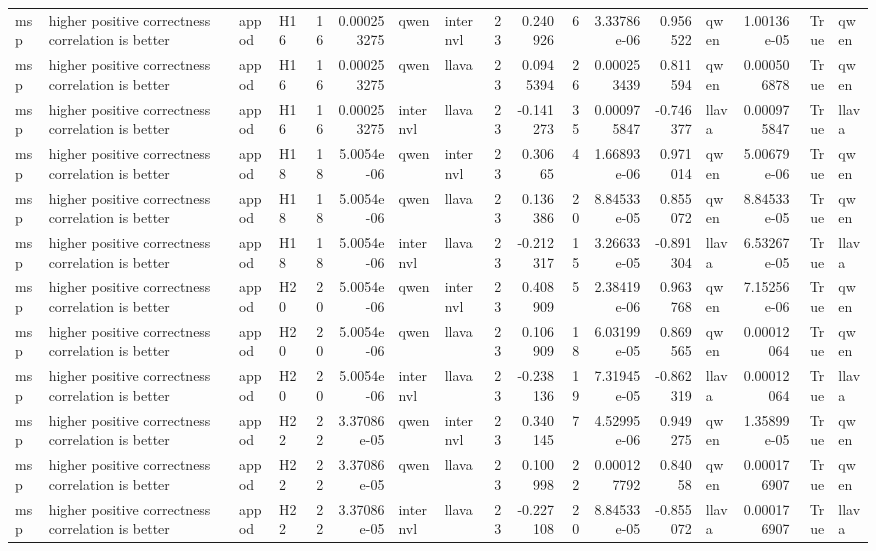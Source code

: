 \begin{longtable}{llllrrllrrrrrlrrl}
msp & higher positive correctness correlation is better & appod & H16 & 16 & 0.000253275 & qwen & internvl & 23 & 0.240926 & 6 & 3.33786e-06 & 0.956522 & qwen & 1.00136e-05 & True & qwen \\
msp & higher positive correctness correlation is better & appod & H16 & 16 & 0.000253275 & qwen & llava & 23 & 0.0945394 & 26 & 0.000253439 & 0.811594 & qwen & 0.000506878 & True & qwen \\
msp & higher positive correctness correlation is better & appod & H16 & 16 & 0.000253275 & internvl & llava & 23 & -0.141273 & 35 & 0.000975847 & -0.746377 & llava & 0.000975847 & True & llava \\
msp & higher positive correctness correlation is better & appod & H18 & 18 & 5.0054e-06 & qwen & internvl & 23 & 0.30665 & 4 & 1.66893e-06 & 0.971014 & qwen & 5.00679e-06 & True & qwen \\
msp & higher positive correctness correlation is better & appod & H18 & 18 & 5.0054e-06 & qwen & llava & 23 & 0.136386 & 20 & 8.84533e-05 & 0.855072 & qwen & 8.84533e-05 & True & qwen \\
msp & higher positive correctness correlation is better & appod & H18 & 18 & 5.0054e-06 & internvl & llava & 23 & -0.212317 & 15 & 3.26633e-05 & -0.891304 & llava & 6.53267e-05 & True & llava \\
msp & higher positive correctness correlation is better & appod & H20 & 20 & 5.0054e-06 & qwen & internvl & 23 & 0.408909 & 5 & 2.38419e-06 & 0.963768 & qwen & 7.15256e-06 & True & qwen \\
msp & higher positive correctness correlation is better & appod & H20 & 20 & 5.0054e-06 & qwen & llava & 23 & 0.106909 & 18 & 6.03199e-05 & 0.869565 & qwen & 0.00012064 & True & qwen \\
msp & higher positive correctness correlation is better & appod & H20 & 20 & 5.0054e-06 & internvl & llava & 23 & -0.238136 & 19 & 7.31945e-05 & -0.862319 & llava & 0.00012064 & True & llava \\
msp & higher positive correctness correlation is better & appod & H22 & 22 & 3.37086e-05 & qwen & internvl & 23 & 0.340145 & 7 & 4.52995e-06 & 0.949275 & qwen & 1.35899e-05 & True & qwen \\
msp & higher positive correctness correlation is better & appod & H22 & 22 & 3.37086e-05 & qwen & llava & 23 & 0.100998 & 22 & 0.000127792 & 0.84058 & qwen & 0.000176907 & True & qwen \\
msp & higher positive correctness correlation is better & appod & H22 & 22 & 3.37086e-05 & internvl & llava & 23 & -0.227108 & 20 & 8.84533e-05 & -0.855072 & llava & 0.000176907 & True & llava \\

\end{longtable}
